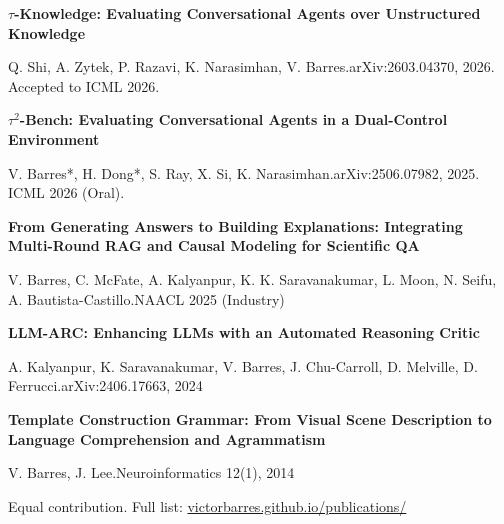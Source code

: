 \documentclass[10.5pt,a4paper]{article}
\newcommand{\paper}[3]{%
  \noindent
  \textbf{#1}\par
  \textcolor{muted}{\small #2.\hfill #3}\par
  \vspace{4pt}
}
\begin{document}
\paper{$\tau$-Knowledge: Evaluating Conversational Agents over Unstructured Knowledge}
  {Q. Shi, A. Zytek, P. Razavi, K. Narasimhan, V. Barres}
  {arXiv:2603.04370, 2026. Accepted to ICML 2026.}

\paper{$\tau^2$-Bench: Evaluating Conversational Agents in a Dual-Control Environment}
  {V. Barres*, H. Dong*, S. Ray, X. Si, K. Narasimhan}
  {arXiv:2506.07982, 2025. ICML 2026 (Oral).}

\paper{From Generating Answers to Building Explanations: Integrating Multi-Round RAG and Causal Modeling for Scientific QA}
  {V. Barres, C. McFate, A. Kalyanpur, K. K. Saravanakumar, L. Moon, N. Seifu, A. Bautista-Castillo}
  {NAACL 2025 (Industry)}

\paper{LLM-ARC: Enhancing LLMs with an Automated Reasoning Critic}
  {A. Kalyanpur, K. Saravanakumar, V. Barres, J. Chu-Carroll, D. Melville, D. Ferrucci}
  {arXiv:2406.17663, 2024}

\paper{Template Construction Grammar: From Visual Scene Description to Language Comprehension and Agrammatism}
  {V. Barres, J. Lee}
  {Neuroinformatics 12(1), 2014}

\vspace{4pt}
\textcolor{muted}{\small * Equal contribution. Full list: \href{https://victorbarres.github.io/publications/}{victorbarres.github.io/publications/}}
\end{document}
